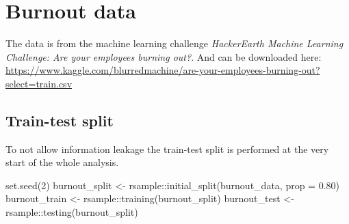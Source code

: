 \documentclass[
]{book}
\newenvironment{Shaded}{\begin{snugshade}}{\end{snugshade}}
\newcommand{\AttributeTok}[1]{\textcolor[rgb]{0.77,0.63,0.00}{#1}}
\newcommand{\CommentTok}[1]{\textcolor[rgb]{0.56,0.35,0.01}{\textit{#1}}}
\newcommand{\DecValTok}[1]{\textcolor[rgb]{0.00,0.00,0.81}{#1}}
\newcommand{\FloatTok}[1]{\textcolor[rgb]{0.00,0.00,0.81}{#1}}
\newcommand{\FunctionTok}[1]{\textcolor[rgb]{0.00,0.00,0.00}{#1}}
\newcommand{\NormalTok}[1]{#1}
\newcommand{\OtherTok}[1]{\textcolor[rgb]{0.56,0.35,0.01}{#1}}
\newcommand{\SpecialCharTok}[1]{\textcolor[rgb]{0.00,0.00,0.00}{#1}}
\newcommand{\StringTok}[1]{\textcolor[rgb]{0.31,0.60,0.02}{#1}}
\begin{document}
\hypertarget{burnout-data}{%
\section{Burnout data}\label{burnout-data}}

The data is from the machine learning challenge \emph{HackerEarth Machine Learning Challenge: Are your employees burning out?}. And can be downloaded here: \url{https://www.kaggle.com/blurredmachine/are-your-employees-burning-out?select=train.csv}

\begin{Shaded}
\end{Shaded}

\hypertarget{train-test-split}{%
\subsection{Train-test split}\label{train-test-split}}

To not allow information leakage the train-test split is performed at the very start of the whole analysis.

\begin{Shaded}
\begin{Highlighting}[]
\FunctionTok{set.seed}\NormalTok{(}\DecValTok{2}\NormalTok{)}
\NormalTok{burnout\_split }\OtherTok{\textless{}{-}}\NormalTok{ rsample}\SpecialCharTok{::}\FunctionTok{initial\_split}\NormalTok{(burnout\_data, }\AttributeTok{prop =} \FloatTok{0.80}\NormalTok{)}
\NormalTok{burnout\_train }\OtherTok{\textless{}{-}}\NormalTok{ rsample}\SpecialCharTok{::}\FunctionTok{training}\NormalTok{(burnout\_split)}
\NormalTok{burnout\_test  }\OtherTok{\textless{}{-}}\NormalTok{ rsample}\SpecialCharTok{::}\FunctionTok{testing}\NormalTok{(burnout\_split)}
\end{Highlighting}
\end{Shaded}
\end{document}
